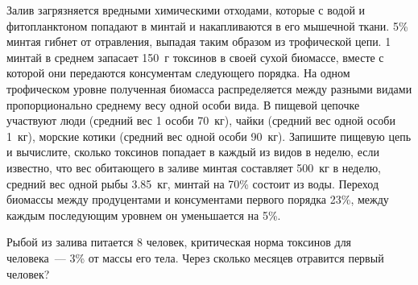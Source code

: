 
Залив загрязняется вредными химическими отходами, которые с водой и фитопланктоном попадают в минтай и 
накапливаются в его мышечной ткани. 5\% минтая гибнет от отравления, выпадая таким образом из трофической цепи. 
1 минтай в среднем запасает 150~г токсинов в своей сухой биомассе, вместе с которой они передаются консументам 
следующего порядка. На одном трофическом уровне полученная биомасса распределяется между разными видами 
пропорционально среднему весу одной особи вида. В пищевой цепочке участвуют люди (средний вес 1 особи 70~кг), 
чайки (средний вес одной особи 1~кг), морские котики (средний вес одной особи 90~кг). Запишите пищевую цепь и 
вычислите, сколько токсинов попадает в каждый из видов в неделю, если известно, что вес обитающего в заливе минтая 
составляет 500~кг в неделю, средний вес одной рыбы 3.85~кг, минтай на 70\% состоит из воды. Переход биомассы между 
продуцентами и консументами первого порядка 23\%, между каждым последующим уровнем он уменьшается на 5\%.

Рыбой из залива питается 8 человек, критическая норма токсинов для человека~— 3\% от массы его тела. Через 
сколько месяцев отравится первый человек?
